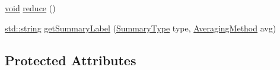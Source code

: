 \begin{DoxyCompactItemize}
\item 
\hyperlink{sound_8c_ae35f5844602719cf66324f4de2a658b3}{void} \hyperlink{class_vamp_1_1_host_ext_1_1_plugin_summarising_adapter_1_1_impl_a4d3fa272a847e54eb6bd9ddb75906b6a}{reduce} ()
\item 
\hyperlink{test__lib_f_l_a_c_2format_8c_ab02026ad0de9fb6c1b4233deb0a00c75}{std\+::string} \hyperlink{class_vamp_1_1_host_ext_1_1_plugin_summarising_adapter_1_1_impl_a0ef9ce1bca0927d2effa60f00cec07ea}{get\+Summary\+Label} (\hyperlink{class_vamp_1_1_host_ext_1_1_plugin_summarising_adapter_af504f810448961fc489e9b6572471705}{Summary\+Type} type, \hyperlink{class_vamp_1_1_host_ext_1_1_plugin_summarising_adapter_a294e9eed9c541dcedbaa4f2dfda1ac76}{Averaging\+Method} avg)
\end{DoxyCompactItemize}
\subsection*{Protected Attributes}
